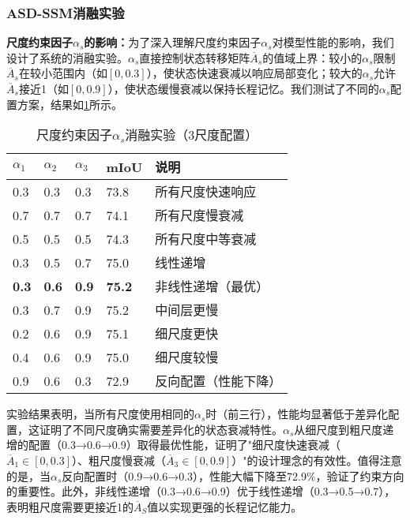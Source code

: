 \documentclass[preprint,12pt]{elsarticle}
\begin{document}
\subsubsection{ASD-SSM消融实验}

\textbf{尺度约束因子$\alpha_s$的影响：}为了深入理解尺度约束因子$\alpha_s$对模型性能的影响，我们设计了系统的消融实验。$\alpha_s$直接控制状态转移矩阵$\overline{A}_s$的值域上界：较小的$\alpha_s$限制$\overline{A}_s$在较小范围内（如$[0, 0.3]$），使状态快速衰减以响应局部变化；较大的$\alpha_s$允许$\overline{A}_s$接近1（如$[0, 0.9]$），使状态缓慢衰减以保持长程记忆。我们测试了不同的$\alpha_s$配置方案，结果如\cref{tab:alpha_ablation}所示。

\begin{table}[htbp!]
	\centering
	\caption{尺度约束因子$\alpha_s$消融实验（3尺度配置）}
	\label{tab:alpha_ablation}
	\begin{tabular}{@{}lllll@{}}
		\toprule
		$\alpha_1$ & $\alpha_2$ & $\alpha_3$ & mIoU & 说明 \\ 
		\midrule
		0.3 & 0.3 & 0.3 & 73.8 & 所有尺度快速响应 \\
		0.7 & 0.7 & 0.7 & 74.1 & 所有尺度慢衰减 \\
		0.5 & 0.5 & 0.5 & 74.3 & 所有尺度中等衰减 \\
		\midrule
		0.3 & 0.5 & 0.7 & 75.0 & 线性递增 \\
		\textbf{0.3} & \textbf{0.6} & \textbf{0.9} & \textbf{75.2} & 非线性递增（最优） \\
		0.3 & 0.7 & 0.9 & 75.2 & 中间层更慢 \\
		0.2 & 0.6 & 0.9 & 75.1 & 细尺度更快 \\
		0.4 & 0.6 & 0.9 & 75.0 & 细尺度较慢 \\
		\midrule
		0.9 & 0.6 & 0.3 & 72.9 & 反向配置（性能下降） \\
		\bottomrule
	\end{tabular}
\end{table}

实验结果表明，当所有尺度使用相同的$\alpha_s$时（前三行），性能均显著低于差异化配置，这证明了不同尺度确实需要差异化的状态衰减特性。$\alpha_s$从细尺度到粗尺度递增的配置（0.3→0.6→0.9）取得最优性能，证明了"细尺度快速衰减（$\overline{A}_1 \in [0,0.3]$）、粗尺度慢衰减（$\overline{A}_3 \in [0,0.9]$）"的设计理念的有效性。值得注意的是，当$\alpha_s$反向配置时（0.9→0.6→0.3），性能大幅下降至72.9\%，验证了约束方向的重要性。此外，非线性递增（0.3→0.6→0.9）优于线性递增（0.3→0.5→0.7），表明粗尺度需要更接近1的$\overline{A}_S$值以实现更强的长程记忆能力。
\end{document}
